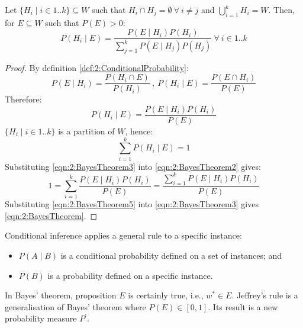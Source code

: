 \begin{thm}
  \label{thm:2:BayesTheorem}

  Let $\{H_i \mid i \in 1 .. k\}\subseteq W$ such that
  $H_i \cap H_j = \emptyset\ \forall\ i \neq j$ and $\bigcup_{i = 1}^{k} H_i = W$.
  Then, for $E \subseteq W$ such that $P(E) > 0$:
  \begin{equation}
    \label{eqn:2:BayesTheorem}
    P(H_i \mid E)
    = \frac{P(E \mid H_i)P(H_i)}{\sum_{j = 1}^{k} P(E \mid H_j) P(H_j)}\
    \forall\ i \in 1 .. k
  \end{equation}
  \begin{proof}
    By definition \ref{def:2:ConditionalProbability}:
    \begin{equation}
      \label{eqn:2:BayesTheorem1}
      P(E \mid H_i) = \frac{P(H_i \cap E)}{P(H_i)}\ ,\
      P(H_i \mid E) = \frac{P(E \cap H_i)}{P(E)}
    \end{equation}
    Therefore:
    \begin{equation}
      \label{eqn:2:BayesTheorem2}
      P(H_i \mid E) = \frac{P(E \mid H_i) P(H_i)}{P(E)}
    \end{equation}
    $\{H_i\mid i\in 1 .. k\}$ is a partition of $W$, hence:
    \begin{equation}
      \label{eqn:2:BayesTheorem3}
      \sum_{i = 1}^{k}P(H_i \mid E) = 1
    \end{equation}
    Substituting \ref{eqn:2:BayesTheorem3} into \ref{eqn:2:BayesTheorem2} gives:
    \begin{equation}
      \label{eqn:2:BayesTheorem5}
      1 = \sum_{i = 1}^{k}\frac{P(E \mid H_i)P(H_i)}{P(E)}
      = \frac{\sum_{i = 1}^{k} P(E \mid H_i) P(H_i)}{P(E)}
    \end{equation}
    Substituting \ref{eqn:2:BayesTheorem5} into \ref{eqn:2:BayesTheorem3} gives \ref{eqn:2:BayesTheorem}.
  \end{proof}
\end{thm}

Conditional inference applies a general rule to a specific instance:
\begin{itemize}
  \item $P(A \mid B)$ is a conditional probability defined on a set of instances; and
  \item $P(B)$ is a probability defined on a specific instance.
\end{itemize}

In Bayes' theorem, proposition $E$ is certainly true, i.e., $w^* \in E$.
Jeffrey's rule is a generalisation of Bayes' theorem where $P(E) \in [0, 1]$.
Its result is a new probability measure $P^\prime$.

